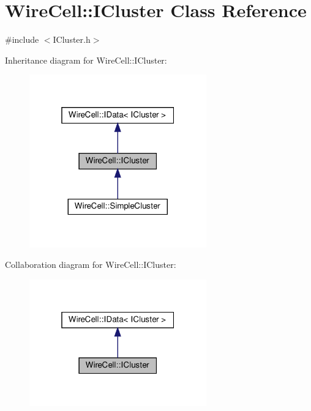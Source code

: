 \hypertarget{class_wire_cell_1_1_i_cluster}{}\section{Wire\+Cell\+:\+:I\+Cluster Class Reference}
\label{class_wire_cell_1_1_i_cluster}


{\ttfamily \#include $<$I\+Cluster.\+h$>$}



Inheritance diagram for Wire\+Cell\+:\+:I\+Cluster\+:
\nopagebreak
\begin{figure}[H]
\begin{center}
\leavevmode
\includegraphics[width=217pt]{class_wire_cell_1_1_i_cluster__inherit__graph}
\end{center}
\end{figure}


Collaboration diagram for Wire\+Cell\+:\+:I\+Cluster\+:
\nopagebreak
\begin{figure}[H]
\begin{center}
\leavevmode
\includegraphics[width=217pt]{class_wire_cell_1_1_i_cluster__coll__graph}
\end{center}
\end{figure}
